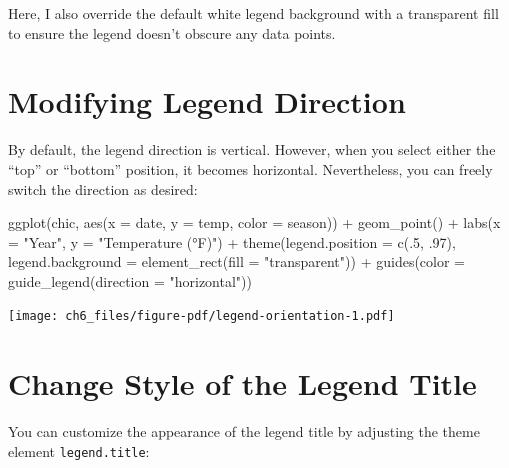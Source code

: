 \documentclass[
  letterpaper,
  DIV=11,
  numbers=noendperiod]{scrreprt}
\newenvironment{Shaded}{\begin{snugshade}}{\end{snugshade}}
\newcommand{\AttributeTok}[1]{\textcolor[rgb]{0.40,0.45,0.13}{#1}}
\newcommand{\DecValTok}[1]{\textcolor[rgb]{0.68,0.00,0.00}{#1}}
\newcommand{\FunctionTok}[1]{\textcolor[rgb]{0.28,0.35,0.67}{#1}}
\newcommand{\NormalTok}[1]{\textcolor[rgb]{0.00,0.23,0.31}{#1}}
\newcommand{\SpecialCharTok}[1]{\textcolor[rgb]{0.37,0.37,0.37}{#1}}
\newcommand{\StringTok}[1]{\textcolor[rgb]{0.13,0.47,0.30}{#1}}
\begin{document}
Here, I also override the default white legend background with a
transparent fill to ensure the legend doesn't obscure any data points.

\section{Modifying Legend Direction}\label{modifying-legend-direction}

By default, the legend direction is vertical. However, when you select
either the ``top'' or ``bottom'' position, it becomes horizontal.
Nevertheless, you can freely switch the direction as desired:

\begin{Shaded}
\begin{Highlighting}[]
\FunctionTok{ggplot}\NormalTok{(chic, }\FunctionTok{aes}\NormalTok{(}\AttributeTok{x =}\NormalTok{ date, }\AttributeTok{y =}\NormalTok{ temp, }\AttributeTok{color =}\NormalTok{ season)) }\SpecialCharTok{+}
  \FunctionTok{geom\_point}\NormalTok{() }\SpecialCharTok{+}
  \FunctionTok{labs}\NormalTok{(}\AttributeTok{x =} \StringTok{"Year"}\NormalTok{, }\AttributeTok{y =} \StringTok{"Temperature (°F)"}\NormalTok{) }\SpecialCharTok{+}
  \FunctionTok{theme}\NormalTok{(}\AttributeTok{legend.position =} \FunctionTok{c}\NormalTok{(.}\DecValTok{5}\NormalTok{, .}\DecValTok{97}\NormalTok{),}
        \AttributeTok{legend.background =} \FunctionTok{element\_rect}\NormalTok{(}\AttributeTok{fill =} \StringTok{"transparent"}\NormalTok{)) }\SpecialCharTok{+}
  \FunctionTok{guides}\NormalTok{(}\AttributeTok{color =} \FunctionTok{guide\_legend}\NormalTok{(}\AttributeTok{direction =} \StringTok{"horizontal"}\NormalTok{))}
\end{Highlighting}
\end{Shaded}

\texttt{[image: ch6\_files/figure-pdf/legend-orientation-1.pdf]}

\section{Change Style of the Legend
Title}\label{change-style-of-the-legend-title}

You can customize the appearance of the legend title by adjusting the
theme element \texttt{legend.title}:
\end{document}
